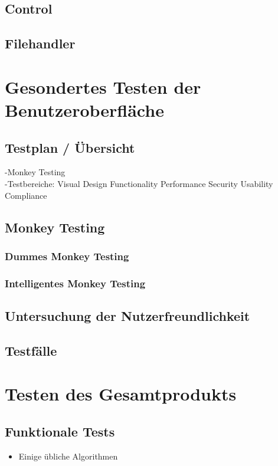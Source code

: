 \documentclass[parskip=full]{scrartcl}
\begin{document}
\subsection{Control}
\subsection{Filehandler}


\section{Gesondertes Testen der Benutzeroberfläche}

\subsection{Testplan / Übersicht}
-Monkey Testing \\
-Testbereiche: Visual Design Functionality Performance Security Usability Compliance

\subsection{Monkey Testing}
\subsubsection{Dummes Monkey Testing}
\subsubsection{Intelligentes Monkey Testing}

\subsection{Untersuchung der Nutzerfreundlichkeit}

\subsection{Testfälle}



\section{Testen des Gesamtprodukts}

\subsection{Funktionale Tests}
\begin{itemize}
\item Einige übliche Algorithmen
\end{itemize}
\end{document}
